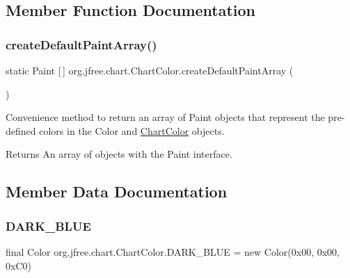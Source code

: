 \subsection{Member Function Documentation}
\mbox{\label{classorg_1_1jfree_1_1chart_1_1_chart_color_af436c491352218d70ac2fba2583ab32c}} 
\subsubsection{\texorpdfstring{create\+Default\+Paint\+Array()}{createDefaultPaintArray()}}
{\footnotesize\ttfamily static Paint \mbox{[}$\,$\mbox{]} org.\+jfree.\+chart.\+Chart\+Color.\+create\+Default\+Paint\+Array (\begin{DoxyParamCaption}{ }\end{DoxyParamCaption})\hspace{0.3cm}{\ttfamily [static]}}

Convenience method to return an array of {\ttfamily Paint} objects that represent the pre-\/defined colors in the {\ttfamily Color} and {\ttfamily \mbox{\hyperlink{classorg_1_1jfree_1_1chart_1_1_chart_color}{Chart\+Color}}} objects.

\begin{DoxyReturn}{Returns}
An array of objects with the {\ttfamily Paint} interface. 
\end{DoxyReturn}


\subsection{Member Data Documentation}
\mbox{\label{classorg_1_1jfree_1_1chart_1_1_chart_color_a06bcfbec1171d0d870a79fe2758eb414}} 
\subsubsection{\texorpdfstring{D\+A\+R\+K\+\_\+\+B\+L\+UE}{DARK\_BLUE}}
{\footnotesize\ttfamily final Color org.\+jfree.\+chart.\+Chart\+Color.\+D\+A\+R\+K\+\_\+\+B\+L\+UE = new Color(0x00, 0x00, 0x\+C0)\hspace{0.3cm}{\ttfamily [static]}}

